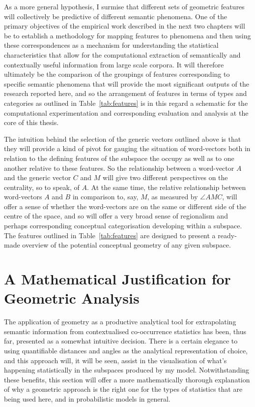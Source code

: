 As a more general hypothesis, I surmise that different sets of geometric features will collectively be predictive of different semantic phenomena.  One of the primary objectives of the empirical work described in the next two chapters will be to establish a methodology for mapping features to phenomena and then using these correspondences as a mechanism for understanding the statistical characteristics that allow for the computational extraction of semantically and contextually useful information from large scale corpora.  It will therefore ultimately be the comparison of the groupings of features corresponding to specific semantic phenomena that will provide the most significant outputs of the research reported here, and so the arrangement of features in terms of types and categories as outlined in Table~\ref{tab:features} is in this regard a schematic for the computational experimentation and corresponding evaluation and analysis at the core of this thesis.

The intuition behind the selection of the generic vectors outlined above is that they will provide a kind of pivot for gauging the situation of word-vectors both in relation to the defining features of the subspace the occupy as well as to one another relative to these features.  So the relationship between a word-vector $A$ and the generic vector $C$ and $M$ will give two different perspectives on the centrality, so to speak, of $A$.  At the same time, the relative relationship between word-vectors $A$ and $B$ in comparison to, say, $M$, as measured by $\angle AMC$, will offer a sense of whether the word-vectors are on the same or different side of the centre of the space, and so will offer a very broad sense of regionalism and perhaps corresponding conceptual categorisation developing within a subspace.  The features outlined in Table~\ref{tab:features} are designed to present a ready-made overview of the potential conceptual geometry of any given subspace.

\section{A Mathematical Justification for Geometric Analysis} \label{sec:math}
The application of geometry as a productive analytical tool for extrapolating semantic information from contextualised co-occurrence statistics has been, thus far, presented as a somewhat intuitive decision.  There is a certain elegance to using quantifiable distances and angles as the analytical representation of choice, and this approach will, it will be seen, assist in the visualisation of what's happening statistically in the subspaces produced by my model.  Notwithstanding these benefits, this section will offer a more mathematically thorough explanation of why a geometric approach is the right one for the types of statistics that are being used here, and in probabilistic models in general.


